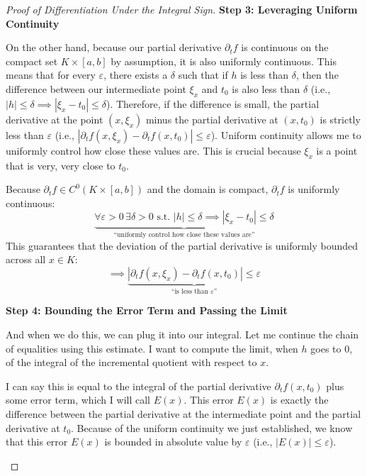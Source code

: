 \begin{proof}[Proof of Differentiation Under the Integral Sign]
\textbf{Step 3: Leveraging Uniform Continuity}
\begin{spoken-clean}[00:02:10 - 00:03:00]
On the other hand, because our partial derivative $\partial_t f$ is continuous on the compact set $K \times [a,b]$ by assumption, it is also uniformly continuous. This means that for every $\varepsilon$, there exists a $\delta$ such that if $h$ is less than $\delta$, then the difference between our intermediate point $\xi_x$ and $t_0$ is also less than $\delta$ (i.e., $|h| \le \delta \implies |\xi_x - t_0| \le \delta$). Therefore, if the difference is small, the partial derivative at the point $(x, \xi_x)$ minus the partial derivative at $(x, t_0)$ is strictly less than $\varepsilon$ (i.e., $|\partial_t f(x, \xi_x) - \partial_t f(x, t_0)| \le \varepsilon$). Uniform continuity allows me to uniformly control how close these values are. This is crucial because $\xi_x$ is a point that is very, very close to $t_0$.
\end{spoken-clean}

\begin{math-stroke}
Because $\partial_t f \in C^0(K \times [a,b])$ and the domain is compact, $\partial_t f$ is uniformly continuous:
\[
\underbrace{\forall \varepsilon > 0 \, \exists \delta > 0 \text{ s.t. } |h| \le \delta \implies |\xi_x - t_0| \le \delta}_{\text{``uniformly control how close these values are''}}
\]
This guarantees that the deviation of the partial derivative is uniformly bounded across all $x \in K$:
\[
\implies \underbrace{| \partial_t f(x, \xi_x) - \partial_t f(x, t_0) | \le \varepsilon}_{\text{``is less than } \varepsilon \text{''}}
\]
\end{math-stroke}

\textbf{Step 4: Bounding the Error Term and Passing the Limit}
\begin{spoken-clean}[00:03:00 - 00:06:18]
And when we do this, we can plug it into our integral. Let me continue the chain of equalities using this estimate. I want to compute the limit, when $h$ goes to $0$, of the integral of the incremental quotient with respect to $x$. 

I can say this is equal to the integral of the partial derivative $\partial_t f(x, t_0)$ plus some error term, which I will call $E(x)$. This error $E(x)$ is exactly the difference between the partial derivative at the intermediate point and the partial derivative at $t_0$. Because of the uniform continuity we just established, we know that this error $E(x)$ is bounded in absolute value by $\varepsilon$ (i.e., $|E(x)| \le \varepsilon$). 


\end{spoken-clean}
\end{proof}
